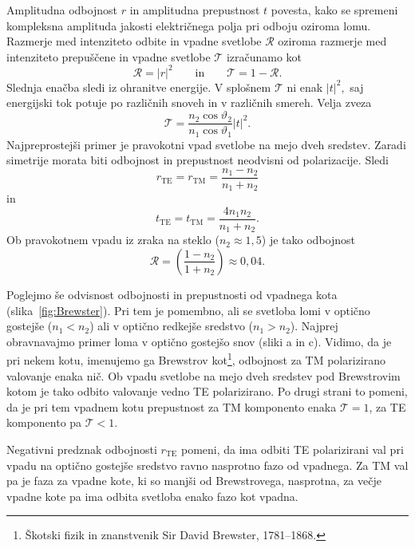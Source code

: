 Amplitudna odbojnost $r$ in amplitudna prepustnost $t$ povesta, kako se spremeni 
kompleksna amplituda jakosti električnega polja pri odboju oziroma lomu.
Razmerje med intenziteto odbite in vpadne svetlobe $\mathcal{R}$ oziroma 
razmerje med intenziteto prepuščene in vpadne svetlobe
$\mathcal{T}$ izračunamo kot 
\begin{equation}
\mathcal{R}=\left|r\right|^{2} \qquad \mathrm{in} \qquad \mathcal{T}=1-\mathcal{R}.
\end{equation}
Slednja enačba sledi iz ohranitve energije. V splošnem $\mathcal{T}$
ni enak $\left|t\right|^{2},$ saj energijski tok potuje po različnih
snoveh in v različnih smereh. Velja zveza
\begin{equation}
\mathcal{T}=\frac{n_{2}\cos\vartheta_{2}}{n_{1}\cos\vartheta_{1}}\left|t\right|^{2}.
\end{equation}
Najpreprostejši primer je pravokotni vpad svetlobe na mejo dveh sredstev. Zaradi simetrije 
morata biti odbojnost in prepustnost neodvisni od polarizacije. Sledi 
\begin{equation}
r_{\mathrm{TE}} = r_{\mathrm{TM}} = \frac{n_1-n_2}{n_1+n_2}
\end{equation}
in
\begin{equation}
t_{\mathrm{TE}} = t_{\mathrm{TM}} = \frac{4n_1n_2}{n_1+n_2}. 
\end{equation}
Ob pravokotnem vpadu iz zraka na steklo ($n_2 \approx 1,5$) je tako odbojnost 
\begin{equation}
\mathcal{R} = \left(\frac{1-n_2}{1+n_2}\right) \approx 0,04.
\end{equation}

Poglejmo še odvisnost odbojnosti in prepustnosti od vpadnega kota (slika~\ref{fig:Brewster}). 
Pri tem je pomembno, ali se svetloba lomi v optično gostejše ($n_1<n_2$) ali v optično
redkejše sredstvo ($n_1>n_2$). Najprej obravnavajmo primer loma v optično gostejšo snov (sliki a in c).
Vidimo, da je pri nekem kotu, imenujemo ga Brewstrov 
kot\footnote{Škotski fizik in znanstvenik Sir David Brewster, 1781--1868.}, odbojnost 
za TM polarizirano valovanje enaka nič. Ob vpadu svetlobe na mejo dveh sredstev pod 
Brewstrovim kotom je tako odbito valovanje vedno TE polarizirano. Po drugi strani to pomeni,
da je pri tem vpadnem kotu prepustnost za TM komponento enaka $\mathcal{T}=1$, za TE komponento pa $\mathcal{T}<1$. 

Negativni predznak odbojnosti $r_{\mathrm{TE}}$ pomeni, da ima odbiti TE polarizirani val pri vpadu
na optično gostejše sredstvo ravno nasprotno 
fazo od vpadnega. Za TM val pa je faza za vpadne kote, ki so manjši od Brewstrovega, nasprotna, 
za večje vpadne kote pa ima odbita svetloba enako fazo kot vpadna. 

